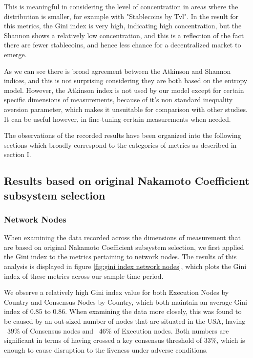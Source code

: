 \documentclass[conference]{IEEEtran}
\begin{document}
This is meaningful in considering the level of concentration in areas where the distribution is smaller, for example with "Stablecoins by Tvl".  In the result for this metrics, the Gini index is very high, indicating high concentration, but the Shannon shows a relatively low concentration, and this is a reflection of the fact there are fewer stablecoins, and hence less chance for a decentralized market to emerge.

As we can see there is broad agreement between the Atkinson and Shannon indices, and this is not surprising considering they are both based on the entropy model.  However, the Atkinson index is not used by our model except for certain specific dimensions of measurements, because of it's non standard inequality aversion parameter, which makes it unsuitable for comparison with other studies. It can be useful however, in fine-tuning certain measurements when needed.

The observations of the recorded results have been organized into the following sections which broadly correspond to the categories of metrics as described in section I.

\subsection{Results based on original Nakamoto Coefficient subsystem selection}

\subsubsection{Network Nodes}
When examining the data recorded across the dimensions of measurement that are based on original Nakamoto Coefficient subsystem selection, we first applied the Gini index to the metrics pertaining to network nodes.  The results of this analysis is displayed in figure \ref{fig:gini index network nodes}, which plots the Gini index of these metrics across our sample time period.

We observe a relatively high Gini index value for both Execution Nodes by Country and Consensus Nodes by Country, which both maintain an average Gini index of 0.85 to 0.86.  When examining the data more closely, this was found to be caused by an out-sized number of nodes that are situated in the USA, having  ~39\% of Consensus nodes and ~46\% of Execution nodes.  Both numbers are significant in terms of having crossed a key consensus threshold of 33\%, which is enough to cause disruption to the liveness under adverse conditions.
\end{document}
